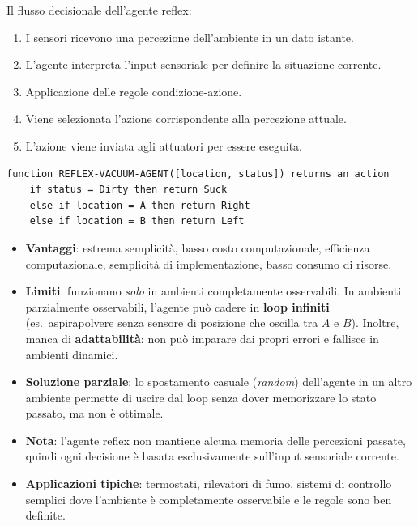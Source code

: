 Il flusso decisionale dell'agente reflex:
\begin{enumerate}
    \item I sensori ricevono una percezione dell'ambiente in un dato istante.
    \item L'agente interpreta l'input sensoriale per definire la situazione corrente.
    \item Applicazione delle regole condizione-azione.
    \item Viene selezionata l'azione corrispondente alla percezione attuale.
    \item L'azione viene inviata agli attuatori per essere eseguita.
\end{enumerate}

\begin{exbox}
\begin{verbatim}
function REFLEX-VACUUM-AGENT([location, status]) returns an action
    if status = Dirty then return Suck
    else if location = A then return Right
    else if location = B then return Left
\end{verbatim}
\end{exbox}

\begin{itemize}
    \item \textbf{Vantaggi}: estrema semplicità, basso costo computazionale, efficienza computazionale, semplicità di implementazione, basso consumo di risorse.
    \item \textbf{Limiti}: funzionano \emph{solo} in ambienti completamente osservabili. In ambienti parzialmente osservabili, l'agente può cadere in \textbf{loop infiniti} (es.\ aspirapolvere senza sensore di posizione che oscilla tra $A$ e $B$). Inoltre, manca di \textbf{adattabilità}: non può imparare dai propri errori e fallisce in ambienti dinamici.
    \item \textbf{Soluzione parziale}: lo spostamento casuale (\textit{random}) dell'agente in un altro ambiente permette di uscire dal loop senza dover memorizzare lo stato passato, ma non è ottimale.
    \item \textbf{Nota}: l'agente reflex non mantiene alcuna memoria delle percezioni passate, quindi ogni decisione è basata esclusivamente sull'input sensoriale corrente.
    \item \textbf{Applicazioni tipiche}: termostati, rilevatori di fumo, sistemi di controllo semplici dove l'ambiente è completamente osservabile e le regole sono ben definite.
\end{itemize}


